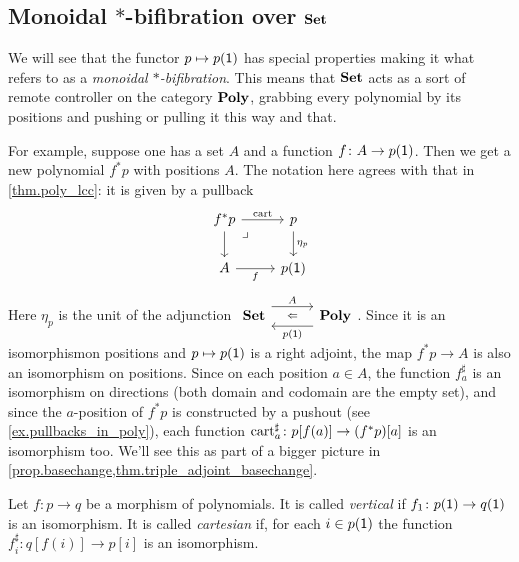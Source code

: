 \documentclass[Book-Poly]{subfiles}
\begin{document}
\subsection{Monoidal $*$-bifibration over $\textbf{Set}$}

We will see that the functor $p\mapsto p(\textsf{1})$ has special properties making it what
\cite{shulman2008framed} refers to as a \emph{monoidal $*$-bifibration}. This means that $\textbf{Set}$ acts as a sort of remote controller on the category $\textbf{Poly}$, grabbing every polynomial by its positions and pushing or pulling it this way and that. 

For example, suppose one has a set $A$ and a function $f\colon A\to p(\textsf{1})$. Then we get a new polynomial $f^*p$ with positions $A$. The notation here agrees with that in \cref{thm.poly_lcc}: it is given by a pullback
\begin{equation}\label{eqn.f^*_defined}
\begin{tikzcd}
	f^*p\ar[r, "\fun{cart}"]\ar[d]&
	p\ar[d, "\eta_p"]\\
	A\ar[r, "f"']&
	p(\1)\ar[ul, phantom, very near end, "\lrcorner"]
\end{tikzcd}
\end{equation}
Here $\eta_p$ is the unit of the adjunction $\adjr{\smset}{A}{p(\1)}{\poly}$. Since it is an isomorphismon positions and $p\mapsto p(\textsf{1})$ is a right adjoint, the map $f^*p\to A$ is also an isomorphism on positions. Since on each position $a\in A$, the function $f^\sharp_a$ is an isomorphism on directions (both domain and codomain are the empty set), and since the $a$-position of $f^*p$ is constructed by a pushout (see \cref{ex.pullbacks_in_poly}), each function $\mathrm{cart}_a^\sharp\colon p[f(a)]\to(f^*p)[a]$ is an isomorphism too. We'll see this as part of a bigger picture in \cref{prop.basechange,thm.triple_adjoint_basechange}.


\begin{definition}
Let $f\colon p\to q$ be a morphism of polynomials. It is called \emph{vertical} if $f_1\colon p(\textsf{1})\to q(\textsf{1})$ is an isomorphism. It is called \emph{cartesian} if, for each $i\in p(\textsf{1})$ the function $f^\sharp_i\colon q[f(i)]\to p[i]$ is an isomorphism.
\end{definition}
\end{document}
